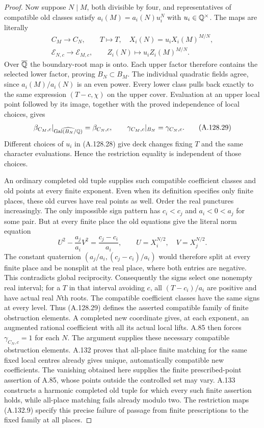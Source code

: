 \begin{proof}
Now suppose $N\mid M$, both divisible by four,
and representatives of compatible old classes satisfy
$a_i(M)=a_i(N)u_i^N$ with $u_i\in\mathbb Q^\times$.
The maps are literally
\[
 \begin{gathered}
 C_M\longrightarrow C_N,\qquad
          T\longmapsto T,\quad X_i(N)=u_iX_i(M)^{M/N},\\
 \mathcal E_{N,c}\longrightarrow\mathcal E_{M,c},
                         \qquad Z_i(N)\longmapsto u_iZ_i(M)^{M/N}.
 \end{gathered}
\tag{A.128.28}
\]
Over $\overline{\mathbb Q}$ the boundary-root map is onto.
Each upper factor therefore contains the selected
lower factor, proving $B_N\subset B_M$.
The individual quadratic fields agree, since
$a_i(M)/a_i(N)$ is an even power.
Every lower class pulls back exactly to the same
expression $(T-c,\chi)$ on the upper cover.
Evaluation at an upper local point followed by its
image, together with the proved independence of
local choices, gives
\[
       \beta_{C_M,c}|_{\widehat{\operatorname{Gal}(B_N/\mathbb Q)}}
                  =\beta_{C_N,c},\qquad
                 \gamma_{C_M,c}|_{B_N}=\gamma_{C_N,c}.
\tag{A.128.29}
\]
Different choices of $u_i$ in (A.128.28) give deck
changes fixing $T$ and the same character evaluations.
Hence the restriction equality is independent of those
choices.

An ordinary completed old tuple supplies such compatible
coefficient classes and old points at every finite
exponent.
Even when its definition specifies only finite places,
these old curves have real points as well.
Order the real punctures increasingly.
The only impossible sign pattern has $c_i<c_j$ and
$a_i<0<a_j$ for some pair.
But at every finite place the old equations give the
literal norm equation
\[
 U^2-\frac{a_j}{a_i}V^2=\frac{c_j-c_i}{a_i},
       \qquad U=X_i^{N/2},\quad V=X_j^{N/2}.
\tag{A.128.30}
\]
The constant quaternion
$(a_j/a_i,(c_j-c_i)/a_i)$ would therefore split
at every finite place and be nonsplit at the real
place, where both entries are negative.
This contradicts global reciprocity.
Consequently the signs select one nonempty real
interval; for a $T$ in that interval avoiding $c$,
all $(T-c_i)/a_i$ are positive and have actual
real $N$th roots.
The compatible coefficient classes have the same
signs at every level.
Thus (A.128.29) defines the asserted compatible family
of finite obstruction elements.
A completed new coordinate gives, at each exponent,
an augmented rational coefficient with all its actual
local lifts.  A.85 then forces $\gamma_{C_N,c}=1$
for each $N$.
The argument supplies these necessary compatible
obstruction elements.  A.132 proves that all-place
finite matching for the same fixed local centres
already gives unique, automatically compatible new
coefficients.  The vanishing obtained here supplies
the finite prescribed-point assertion of A.85, whose
points outside the controlled set may vary.
A.133 constructs a harmonic completed old tuple
for which every such finite assertion holds, while
all-place matching fails already modulo two.
The restriction maps (A.132.9) specify this precise
failure of passage from finite prescriptions to the
fixed family at all places.
\end{proof}

